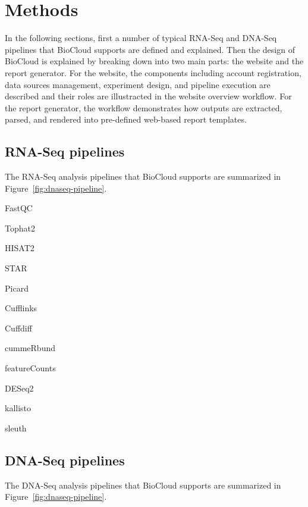 \chapter{Methods}
\label{c:method}

In the following sections, first a number of typical RNA-Seq and DNA-Seq
pipelines that BioCloud supports are defined and explained. Then the design of
BioCloud is explained by breaking down into two main parts: the website and the
report generator. For the website, the components including account
registration, data sources management, experiment design, and pipeline
execution are described and their roles are illustracted in the website
overview workflow. For the report generator, the workflow demonstrates how
outputs are extracted, parsed, and rendered into pre-defined web-based report
templates.



\section{RNA-Seq pipelines}

The RNA-Seq analysis pipelines that BioCloud supports are summarized in
Figure~\ref{fig:dnaseq-pipeline}.




FastQC \cite{:fastqc}

Tophat2 \cite{kim2013:tophat2}

HISAT2 \cite{kim2015:hisat}

STAR \cite{dobin2013:star}

Picard \cite{:picard}

Cufflinks \cite{trapnell2010:transcript}

Cuffdiff \cite{trapnell2013:differential}

cummeRbund \cite{:cummerbund}

featureCounts \cite{liao2014:featurecounts}

DESeq2 \cite{love2014:moderated}

kallisto \cite{bray2016:nearoptimal}

sleuth \cite{pimentel2016:differential}


\section{DNA-Seq pipelines}

The DNA-Seq analysis pipelines that BioCloud supports are summarized in
Figure~\ref{fig:dnaseq-pipeline}.

